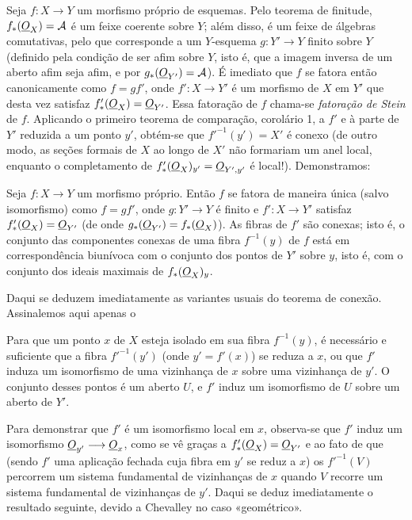 Seja $f:X\longrightarrow Y$ um morfismo próprio de esquemas. Pelo teorema de
finitude, $f_*(\underline{O}_X)=\mathcal A$ é um feixe coerente sobre $Y$; além disso, é um
feixe de álgebras comutativas, pelo que corresponde a um $Y$-esquema
$g:Y'\longrightarrow Y$ finito sobre $Y$ (definido pela condição de ser afim
sobre $Y$, isto é, que a imagem inversa de um aberto afim seja afim, e por
$g_*(\underline{O}_{Y'})=\mathcal A$). É imediato que $f$ se fatora então
canonicamente como $f=gf'$, onde $f':X\longrightarrow Y'$ é um morfismo de
$X$ em $Y'$ que desta vez satisfaz $f'_*(\underline{O}_X)=\underline{O}_{Y'}$. Essa fatoração
de $f$ chama-se \emph{fatoração de Stein} de $f$. Aplicando o primeiro
teorema de comparação, corolário 1, a $f'$ e à parte de $Y'$ reduzida a um
ponto $y'$, obtém-se que $f'^{-1}(y')=X'$ é conexo (de outro modo, as
seções formais de $X$ ao longo de $X'$ não formariam um anel local,
enquanto o completamento de
$f'_*(\underline{O}_X)_{y'}=\underline{O}_{Y',y'}$ é local!). Demonstramos:

 Seja
$f:X\longrightarrow Y$ um morfismo próprio. Então $f$ se fatora de maneira
única (salvo isomorfismo) como $f=gf'$, onde $g:Y'\longrightarrow Y$ é finito
e $f':X\longrightarrow Y'$ satisfaz $f'_*(\underline{O}_X)=\underline{O}_{Y'}$ (de onde
$g_*(\underline{O}_{Y'})=f_*(\underline{O}_X)$). As fibras de $f'$ são conexas; isto é, o
conjunto das componentes conexas de uma fibra $f^{-1}(y)$ de $f$ está em
correspondência biunívoca com o conjunto dos pontos de $Y'$ sobre $y$, isto
é, com o conjunto dos ideais maximais de $f_*(\underline{O}_X)_y$.

Daqui se deduzem imediatamente as variantes usuais do teorema de
conexão. Assinalemos aqui apenas o

 Para que um ponto $x$ de $X$ esteja isolado em sua fibra
$f^{-1}(y)$, é necessário e suficiente que a fibra $f'^{-1}(y')$ (onde
$y'=f'(x)$) se reduza a $x$, ou que $f'$ induza um isomorfismo de uma
vizinhança de $x$ sobre uma vizinhança de $y'$. O conjunto desses pontos é um
aberto $U$, e $f'$ induz um isomorfismo de $U$ sobre um aberto de $Y'$.

Para demonstrar que $f'$ é um isomorfismo local em $x$, observa-se que $f'$
induz um isomorfismo $\underline{O}_{y'}\longrightarrow\underline{O}_x$, como se vê graças a
$f'_*(\underline{O}_X)=\underline{O}_{Y'}$ e ao fato de que (sendo $f'$ uma aplicação fechada
cuja fibra em $y'$ se reduz a $x$) os $f'^{-1}(V)$ percorrem um sistema
fundamental de vizinhanças de $x$ quando $V$ recorre um sistema fundamental de
vizinhanças de $y'$. Daqui se deduz imediatamente o resultado seguinte, devido a
Chevalley no caso «geométrico».

